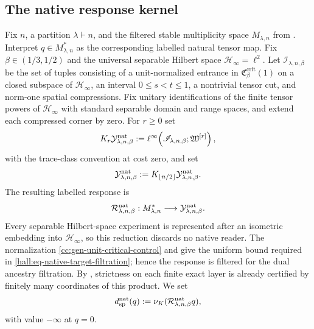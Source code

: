 \documentclass[10pt,reqno]{amsart}
\theoremstyle{plain}
\theoremstyle{definition}
\theoremstyle{remark}
\begin{document}
\subsection{The native response kernel}
\label{hall:subsec-native-kernel}

Fix $n$, a partition $\lambda\vdash n$, and the filtered stable multiplicity
space $M_{\lambda,n}$ from
.  Interpret
$q\in M_{\lambda,n}^*$ as the corresponding labelled natural tensor map.
Fix $\beta\in(1/3,1/2)$ and the universal separable Hilbert space
$\mathcal H_\infty=\ell^2$.  Let $\mathscr I_{\lambda,n,\beta}$ be the set of
tuples consisting of a unit-normalized entrance in
$\mathfrak C_\beta^{\mathrm{crit}}(1)$ on a closed subspace of
$\mathcal H_\infty$, an interval $0\le s<t\le1$, a nontrivial tensor cut,
and norm-one spatial compressions.  Fix unitary identifications of the finite
tensor powers of $\mathcal H_\infty$ with standard separable domain and range
spaces, and extend each compressed corner by zero.  For $r\ge0$ set
\begin{equation}
 K_r\mathcal Y_{\lambda,n,\beta}^{\rm nat}
 :=\ell^\infty\!\left(
 \mathscr I_{\lambda,n,\beta};\mathfrak W^{[r]}\right),
 \label{hall:eq-native-target-filtration}
\end{equation}
with the trace-class convention at cost zero, and set
\[
 \mathcal Y_{\lambda,n,\beta}^{\rm nat}
 :=K_{\lfloor n/2\rfloor}\mathcal Y_{\lambda,n,\beta}^{\rm nat}.
\]
The resulting labelled response is
\begin{equation}
 \mathcal R_{\lambda,n,\beta}^{\rm nat}:M_{\lambda,n}^*
 \longrightarrow\mathcal Y_{\lambda,n,\beta}^{\rm nat}.
 \label{hall:eq-native-response}
\end{equation}
Every separable Hilbert-space experiment is represented after an isometric
embedding into $\mathcal H_\infty$, so this reduction discards no native reader.
The normalization
\eqref{cc:gen-unit-critical-control} and
 give the uniform bound required in
\eqref{hall:eq-native-target-filtration}; hence the response is filtered for
the dual ancestry filtration.  By
, strictness on each finite exact layer is already
certified by finitely many coordinates of this product.  We set
\begin{equation}
 d_{\rm sp}^{\rm nat}(q)
 :=\nu_K(\mathcal R_{\lambda,n,\beta}^{\rm nat}q),
 \label{hall:eq-native-spectral-depth-definition}
\end{equation}
with value $-\infty$ at $q=0$.
\end{document}
